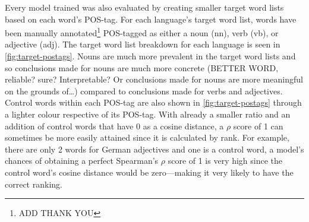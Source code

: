 Every model trained was also evaluated by creating smaller target word lists based on each word’s POS-tag. For each language’s target word list, words have been manually annotated\footnote{ADD THANK YOU} POS-tagged as either a noun (nn), verb (vb), or adjective (adj). The target word list breakdown for each language is seen in \autoref{fig:target-postags}. Nouns are much more prevalent in the target word lists and so conclusions made for nouns are much more concrete (BETTER WORD, reliable? sure? Interpretable? Or conclusions made for nouns are more meaningful on the grounds of…) compared to conclusions made for verbs and adjectives. Control words within each POS-tag are also shown in \autoref{fig:target-postags} through a lighter colour respective of its POS-tag. With already a smaller ratio and an addition of control words that have 0 as a cosine distance, a $\rho$ score of 1 can sometimes be more easily attained since it is calculated by rank. For example, there are only 2 words for German adjectives and one is a control word, a model’s chances of obtaining a perfect Spearman's $\rho$ score of 1 is very high since the control word's cosine distance would be zero—making it very likely to have the correct ranking. 


